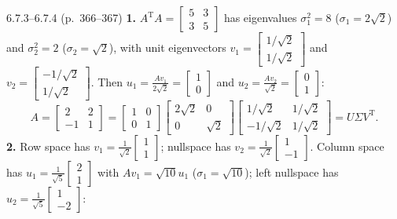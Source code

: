 \documentclass[11pt,a4paper,openany,oneside]{book}
\def\vect#1{#1}%
\def\mathbf#1{#1}%
\newcommand{\vect}[1]{\mathbf{#1}}
\newcommand{\T}{\mathrm{T}}
\numberwithin{equation}{chapter}
\begin{document}
\vfill
\begin{pageend_sol}{6.7.3--6.7.4 (p.\ 366--367)}
\textbf{1.} $A^\T A = \begin{bmatrix}5 & 3\\3 & 5\end{bmatrix}$ has eigenvalues $\sigma_1^2 = 8$ ($\sigma_1 = 2\sqrt{2}$) and $\sigma_2^2 = 2$ ($\sigma_2 = \sqrt{2}$), with unit eigenvectors $\vect{v}_1 = \begin{bmatrix}1/\sqrt{2}\\1/\sqrt{2}\end{bmatrix}$ and $\vect{v}_2 = \begin{bmatrix}-1/\sqrt{2}\\1/\sqrt{2}\end{bmatrix}$. Then $\vect{u}_1 = \frac{A\vect{v}_1}{2\sqrt{2}} = \begin{bmatrix}1\\0\end{bmatrix}$ and $\vect{u}_2 = \frac{A\vect{v}_2}{\sqrt{2}} = \begin{bmatrix}0\\1\end{bmatrix}$:
\[
A = \begin{bmatrix}2 & 2\\-1 & 1\end{bmatrix} = \begin{bmatrix}1 & 0\\0 & 1\end{bmatrix}\begin{bmatrix}2\sqrt{2} & 0\\0 & \sqrt{2}\end{bmatrix}\begin{bmatrix}1/\sqrt{2} & 1/\sqrt{2}\\-1/\sqrt{2} & 1/\sqrt{2}\end{bmatrix} = U\Sigma V^\T.
\]
\textbf{2.} Row space has $\vect{v}_1 = \frac{1}{\sqrt{2}}\begin{bmatrix}1\\1\end{bmatrix}$; nullspace has $\vect{v}_2 = \frac{1}{\sqrt{2}}\begin{bmatrix}1\\-1\end{bmatrix}$. Column space has $\vect{u}_1 = \frac{1}{\sqrt{5}}\begin{bmatrix}2\\1\end{bmatrix}$ with $A\vect{v}_1 = \sqrt{10}\vect{u}_1$ ($\sigma_1 = \sqrt{10}$); left nullspace has $\vect{u}_2 = \frac{1}{\sqrt{5}}\begin{bmatrix}1\\-2\end{bmatrix}$:

\end{pageend_sol}
\end{document}
